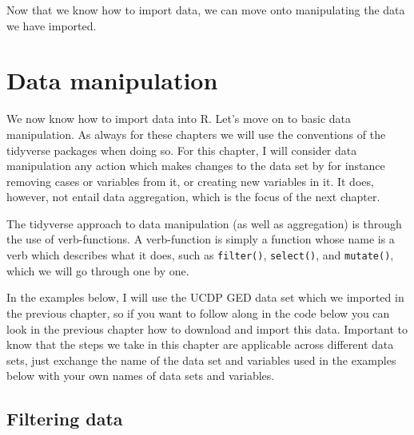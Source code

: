 \documentclass[
]{book}
\begin{document}
Now that we know how to import data, we can move onto manipulating the data we have imported.

\hypertarget{data-manipulation}{%
\chapter{Data manipulation}\label{data-manipulation}}

We now know how to import data into R. Let's move on to basic data manipulation. As always for these chapters we will use the conventions of the tidyverse packages when doing so. For this chapter, I will consider data manipulation any action which makes changes to the data set by for instance removing cases or variables from it, or creating new variables in it. It does, however, not entail data aggregation, which is the focus of the next chapter.

The tidyverse approach to data manipulation (as well as aggregation) is through the use of verb-functions. A verb-function is simply a function whose name is a verb which describes what it does, such as \texttt{filter()}, \texttt{select()}, and \texttt{mutate()}, which we will go through one by one.

In the examples below, I will use the UCDP GED data set which we imported in the previous chapter, so if you want to follow along in the code below you can look in the previous chapter how to download and import this data. Important to know that the steps we take in this chapter are applicable across different data sets, just exchange the name of the data set and variables used in the examples below with your own names of data sets and variables.

\hypertarget{filtering-data}{%
\section{Filtering data}\label{filtering-data}}
\end{document}
